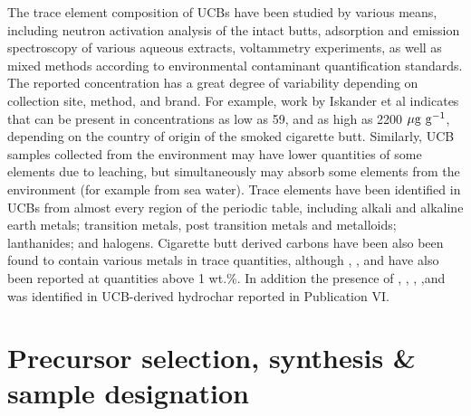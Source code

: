 The trace element composition of UCBs have been studied by various means, including neutron activation analysis of the intact butts,\citep{iskander1992multielement, Iskander1985, jenkins1985neutron, Wu1997} adsorption and emission spectroscopy of various aqueous extracts,\citep{MussaloRauhamaa1986, Kazi2009, Moriwaki2009, Moerman2011, Pelit2013, Dobaradaran2018} voltammetry experiments,\citep{Nitsch1991, Kalcher1993} as well as mixed methods according to environmental contaminant quantification standards.\citep{cardoso2018exposure} The reported concentration has a great degree of variability depending on collection site, method, and brand. For example, work by Iskander et al indicates that  can be present in concentrations as low as 59, and as high as 2200 $\rm{\mu g\ g^{-1}}$, depending on the country of origin of the smoked cigarette butt. Similarly, UCB samples collected from the environment\citep{Dobaradaran2017, Moriwaki2009, Moerman2011, chevalier2018nano} may have lower quantities of some elements due to leaching, but simultaneously may absorb some elements from the environment (for example from sea water). Trace elements have been identified in UCBs from almost every region of the periodic table, including alkali and alkaline earth metals;\cite{MussaloRauhamaa1986, Iskander1985, iskander1992multielement, jenkins1985neutron, Wu1997, cardoso2018exposure}  transition metals, post transition metals and metalloids;\citep{MussaloRauhamaa1986, Dobaradaran2017, Iskander1985, jenkins1985neutron, Wu1997, Moriwaki2009, Moerman2011, Pelit2013, Dobaradaran2018, Ren2017, cardoso2018exposure, chevalier2018nano} lanthanides;\citep{iskander1992multielement} and halogens.\citep{Iskander1985, iskander1992multielement, jenkins1985neutron, Wu1997} Cigarette butt derived carbons have been also been found to contain various metals in trace quantities,\citep{Soltani, Soltani2013, Yazdi2012} although , , and  have also been reported at quantities above 1 wt.\%.\citep{Soltani, Soltani2013, Yazdi2012, Lima2018, Lee2014} In addition the presence of , , , ,and  was identified in UCB-derived hydrochar reported in Publication VI.

\section{Precursor selection, synthesis \& sample designation}

